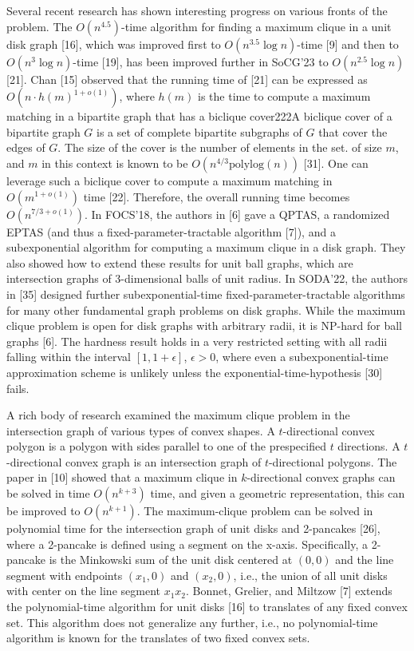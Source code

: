 \documentclass[10pt,a4paper]{amsart}
\begin{document}
Several recent research has shown interesting progress on various fronts of the problem. The $O(n^{4.5})$-time algorithm for finding a maximum clique in a unit disk graph [16], which was improved first to $O(n^{3.5}\log n)$-time [9] and then to $O(n^{3}\log n)$-time [19], has been improved further in SoCG’23 to $O(n^{2.5}\log n)$ [21]. Chan [15] observed that the running time of [21] can be expressed as $O(n\cdot h(m)^{1+o(1)})$, where $h(m)$ is the time to compute a maximum matching in a bipartite graph that has a biclique cover222A biclique cover of a bipartite graph $G$ is a set of complete bipartite subgraphs of $G$ that cover the edges of $G$. The size of the cover is the number of elements in the set. of size $m$, and $m$ in this context is known to be $O(n^{4/3}\mathrm{polylog}(n))$ [31]. One can leverage such a biclique cover to compute a maximum matching in $O(m^{1+o(1)})$ time [22]. Therefore, the overall running time becomes $O(n^{7/3+o(1)})$. In FOCS’18, the authors in [6] gave a QPTAS, a randomized EPTAS (and thus a fixed-parameter-tractable algorithm [7]), and a subexponential algorithm for computing a maximum clique in a disk graph. They also showed how to extend these results for unit ball graphs, which are intersection graphs of 3-dimensional balls of unit radius. In SODA’22, the authors in [35] designed further subexponential-time fixed-parameter-tractable algorithms for many other fundamental graph problems on disk graphs. While the maximum clique problem is open for disk graphs with arbitrary radii, it is NP-hard for ball graphs [6]. The hardness result holds in a very restricted setting with all radii falling within the interval $[1,1+\epsilon]$, $\epsilon>0$, where even a subexponential-time approximation scheme is unlikely unless the exponential-time-hypothesis [30] fails.
\par
\par
A rich body of research examined the maximum clique problem in the intersection graph of various types of convex shapes. A $t$-directional convex polygon is a polygon with sides parallel to one of the prespecified $t$ directions. A $t$-directional convex graph is an intersection graph of $t$-directional polygons. The paper in [10] showed that a maximum clique in $k$-directional convex graphs can be solved in time $O(n^{k+3})$ time, and given a geometric representation, this can be improved to $O(n^{k+1})$. The maximum-clique problem can be solved in polynomial time for the intersection graph of unit disks and 2-pancakes [26], where a 2-pancake is defined using a segment on the x-axis. Specifically, a 2-pancake is the Minkowski sum of the unit disk centered at $(0,0)$ and the line segment with endpoints $(x_{1},0)$ and $(x_{2},0)$, i.e., the union of all unit disks with center on the line segment $x_{1}x_{2}$. Bonnet, Grelier, and Miltzow [7] extends the polynomial-time algorithm for unit disks [16] to translates of any fixed convex set. This algorithm does not generalize any further, i.e., no polynomial-time algorithm is known for the translates of two fixed convex sets.
\end{document}
